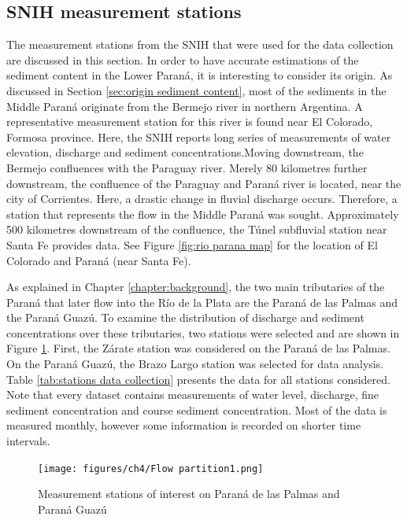 \subsection{SNIH measurement stations}
\label{sec:measurementstations}
The measurement stations from the SNIH that were used for the data collection are discussed in this section. In order to have accurate estimations of the sediment content in the Lower Paraná, it is interesting to consider its origin. As discussed in Section \ref{sec:origin sediment content}, most of the sediments in the Middle Paraná originate from the Bermejo river in northern Argentina. A representative measurement station for this river is found near El Colorado, Formosa province. Here, the SNIH reports long series of measurements of water elevation, discharge and sediment concentrations.Moving downstream, the Bermejo confluences with the Paraguay river. Merely 80 kilometres further downstream, the confluence of the Paraguay and Paraná river is located, near the city of Corrientes. Here, a drastic change in fluvial discharge occurs. Therefore, a station that represents the flow in the Middle Paraná was sought. Approximately 500 kilometres downstream of the confluence, the Túnel subfluvial station near Santa Fe provides data. See Figure \ref{fig:rio parana map} for the location of El Colorado and Paraná (near Santa Fe). 

As explained in Chapter \ref{chapter:background}, the two main tributaries of the Paraná that later flow into the Río de la Plata are the Paraná de las Palmas and the Paraná Guazú. To examine the distribution of discharge and sediment concentrations over these tributaries, two stations were selected and are shown in Figure \ref{fig:flow partition}. First, the Zárate station was considered on the Paraná de las Palmas. On the Paraná Guazú, the Brazo Largo station was selected for data analysis. Table \ref{tab:stations data collection} presents the data for all stations considered. Note that every dataset contains measurements of water level, discharge, fine sediment concentration and course sediment concentration. Most of the data is measured monthly, however some information is recorded on shorter time intervals. 

\begin{figure}[H]
    \centering
    \texttt{[image: figures/ch4/Flow partition1.png]}
    \caption{Measurement stations of interest on Paraná de las Palmas and Paraná Guazú \autocite{googleGoogleEarth}}
    \label{fig:flow partition}
\end{figure}

